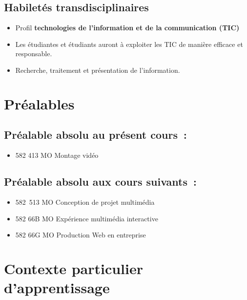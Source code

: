 \documentclass[
]{book}
\providecommand{\tightlist}{%
  \setlength{\itemsep}{0pt}\setlength{\parskip}{0pt}}
\begin{document}
\hypertarget{habiletuxe9s-transdisciplinaires}{%
\subsection{Habiletés transdisciplinaires}\label{habiletuxe9s-transdisciplinaires}}

\begin{itemize}
\tightlist
\item
  Profil \textbf{technologies de l'information et de la communication (TIC)}
\item
  Les étudiantes et étudiants auront à exploiter les TIC de manière efficace et responsable.
\item
  Recherche, traitement et présentation de l'information.
\end{itemize}

\hypertarget{pruxe9alables}{%
\section{Préalables}\label{pruxe9alables}}

\hypertarget{pruxe9alable-absolu-au-pruxe9sent-cours}{%
\subsection{Préalable absolu au présent cours~:}\label{pruxe9alable-absolu-au-pruxe9sent-cours}}

\begin{itemize}
\tightlist
\item
  582 413 MO Montage vidéo
\end{itemize}

\hypertarget{pruxe9alable-absolu-aux-cours-suivants}{%
\subsection{Préalable absolu aux cours suivants~:}\label{pruxe9alable-absolu-aux-cours-suivants}}

\begin{itemize}
\tightlist
\item
  582~513 MO Conception de projet multimédia
\item
  582 66B MO Expérience multimédia interactive
\item
  582 66G MO Production Web en entreprise
\end{itemize}

\hypertarget{contexte-particulier-dapprentissage}{%
\section{Contexte particulier d'apprentissage}\label{contexte-particulier-dapprentissage}}
\end{document}
